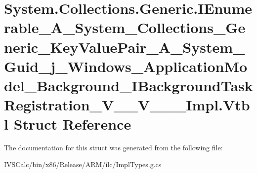 \hypertarget{struct_system_1_1_collections_1_1_generic_1_1_i_enumerable___a___system___collections___generic_49a3b929e99234909e111f10bba2d908}{}\section{System.\+Collections.\+Generic.\+I\+Enumerable\+\_\+\+A\+\_\+\+System\+\_\+\+Collections\+\_\+\+Generic\+\_\+\+Key\+Value\+Pair\+\_\+\+A\+\_\+\+System\+\_\+\+Guid\+\_\+j\+\_\+\+Windows\+\_\+\+Application\+Model\+\_\+\+Background\+\_\+\+I\+Background\+Task\+Registration\+\_\+\+V\+\_\+\+\_\+\+V\+\_\+\+\_\+\+\_\+\+Impl.\+Vtbl Struct Reference}
\label{struct_system_1_1_collections_1_1_generic_1_1_i_enumerable___a___system___collections___generic_49a3b929e99234909e111f10bba2d908}


The documentation for this struct was generated from the following file\+:\begin{DoxyCompactItemize}
\item 
I\+V\+S\+Calc/bin/x86/\+Release/\+A\+R\+M/ilc/Impl\+Types.\+g.\+cs\end{DoxyCompactItemize}
